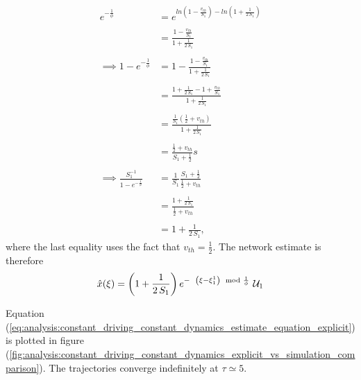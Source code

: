 \begin{enumerate}
\begin{align*}
e^
{
	-\frac
	{
		1
	}
	{
		\phi
	}
}
&= 
e^
{
	ln
	\left(
		1 - 
		\frac
		{
			v_{th}
		}
		{
			S_1	
		}
	\right)
	-
	ln
	\left(
			1 +
		\frac
		{
			1
		}
		{
			2 \, S_1	
		}	
	\right)
}
%
\\
\\
%
&= 
\frac
{
	1 - 
	\frac
	{
		v_{th}
	}
	{
		S_1	
	}
}
{
	1 +
	\frac
	{
		1
	}
	{
		2 \, S_1	
	}	
}
%
\\
\\
%
\implies
1 - e^
{
	-\frac
	{
		1
	}
	{
		\phi
	}
}
&= 
1 - 
\frac
{
	1 - 
	\frac
	{
		v_{th}
	}
	{
		S_1	
	}
}
{
	1 +
	\frac
	{
		1
	}
	{
		2 \, S_1	
	}	
}
%
\\
\\
%
&= 
\frac
{
	1 + 
	\frac
	{
		1
	}
	{
		2 \, S_1
	}
	-
	1 + 
	\frac
	{
		v_{th}
	}
	{
		S_1
	}
}
{
	1 + 
	\frac
	{
		1
	}
	{
		2 \, S_1
	}
}
%
\\
\\
%
&= 
\frac
{
	\frac
	{
		1
	}
	{
		S_1
	}
	\left(
		\frac
		{
			1
		}
		{
			2
		}
		+ v_{th}
	\right)	
}
{
	1 + 
	\frac
	{
		1
	}
	{
		2 \, S_1
	}
}
%
\\
\\
%
&= 
\frac
{
	\frac
	{
		1
	}
	{
		2
	}
	+ v_{th}
}
{
	S_1 + 
	\frac
	{
		1
	}
	{
		2
	}
}s
%
\\
\\
%
\implies 
\frac
{
	S_1^
	{
		-1
	}
}
{
	1 - e^
	{
		-\frac
		{
			1
		}
		{
			\phi
		}
	}
} 
&=
\frac
{
	1
}
{
	S_1
}
\frac
{
	S_1 + 
	\frac
	{
		1
	}
	{
		2
	}
}
{
	\frac
	{
		1
	}
	{
		2
	}
	+ v_{th}
}
%
\\
\\
%
&= 
\frac
{
	1 + 
	\frac
	{
		1		
	}
	{
		2 \, S_1
	}
}
{
	\frac
	{
		1
	}
	{
		2
	}
	+
	v_{th}
}
%
\\
\\
%
&= 
1 +
\frac
{
	1
}
{
	2 \, S_1
}
, 
\end{align*}
where the last equality uses the fact that $v_{th} = \frac{1}{2}$.  
The network estimate is therefore
\begin{equation}
\label{eq:analysis:constant_driving_constant_dynamics_estimate_equation_explicit}
\hat
{
	x
}
(
	\xi
)
= 
\left(
1 + 
\frac
{
	1
}
{
	2 \, S_1
}
\right)
e^
{
	- \hspace{2mm}
	\left(
		\xi - \xi_1^1
	\right)
	\mod
	{
		\frac
		{
			1
		}
		{
			\phi
		}
	}
}
\, \, \mathcal{U}_1
\end{equation}

Equation (\ref{eq:analysis:constant_driving_constant_dynamics_estimate_equation_explicit}) is plotted in figure (\ref{fig:analysis:constant_driving_constant_dynamics_explicit_vs_simulation_comparison}). The trajectories converge indefinitely at $\tau \simeq 5$.


\end{enumerate}
